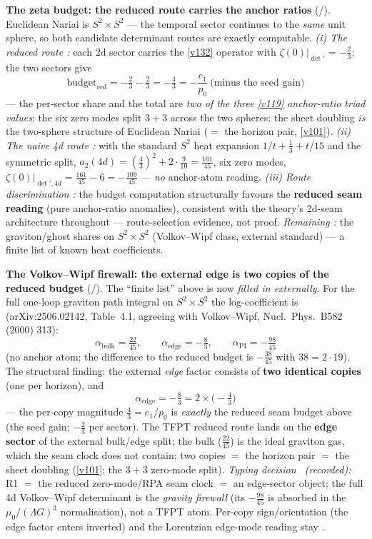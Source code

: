\par\smallskip\noindent\textbf{The zeta budget: the reduced route carries the anchor ratios} (\mE/\mC).
Euclidean Nariai is $S^2\times S^2$ --- the temporal sector continues to the \emph{same} unit sphere,
so both candidate determinant routes are exactly computable. \emph{(i) The reduced route \mE:} each
2d sector carries the \vref{v132} operator with $\zeta(0)|_{\det'}=-\tfrac23$; the two sectors give
\[
  \boxed{\ \text{budget}_{\mathrm{red}}=-\tfrac23-\tfrac23=-\tfrac43=-\frac{e_1}{p_0}\ \text{(minus
  the seed gain)}\ }
\]
--- the per-sector share and the total are \emph{two of the three \vref{v119} anchor-ratio triad values};
the six zero modes split $3+3$ across the two spheres: the sheet doubling \emph{is} the two-sphere
structure of Euclidean Nariai ($=$ the horizon pair, \vref{v101}). \emph{(ii) The naive 4d route \mE:} with
the standard $S^2$ heat expansion $1/t+\tfrac13+t/15$ and the symmetric split, $a_2(4d)=
(\tfrac43)^2+2\cdot\tfrac9{10}=\tfrac{161}{45}$, six zero modes, $\zeta(0)|_{\det',4d}=
\tfrac{161}{45}-6=-\tfrac{109}{45}$ --- \emph{no} anchor-atom reading. \emph{(iii) Route
discrimination \mC:} the budget computation structurally favours the \textbf{reduced seam reading}
(pure anchor-ratio anomalies), consistent with the theory's 2d-seam architecture throughout ---
route-selection evidence, not proof. \emph{Remaining \mC:} the graviton/ghost shares on $S^2\times
S^2$ (Volkov--Wipf class, external standard) --- a finite list of known heat coefficients. 


\par\smallskip\noindent\textbf{The Volkov--Wipf firewall: the external edge is two copies of the reduced budget} (\mE/\mC).
The ``finite list'' above is now \emph{filled in externally}. For the full one-loop graviton path
integral on $S^2\times S^2$ the log-coefficient is (arXiv:2506.02142, Table~4.1, agreeing with
Volkov--Wipf, Nucl.\ Phys.\ B582 (2000) 313):
\[
  \alpha_{\mathrm{bulk}}=\tfrac{22}{45},\qquad \alpha_{\mathrm{edge}}=-\tfrac83,\qquad
  \alpha_{\mathrm{PI}}=-\tfrac{98}{45}
\]
(no anchor atom; the difference to the reduced budget is $-\tfrac{38}{45}$ with $38=2\cdot19$).
The structural finding: the external \emph{edge} factor consists of \textbf{two identical copies} (one
per horizon), and
\[
  \boxed{\ \alpha_{\mathrm{edge}}=-\tfrac83=2\times\bigl(-\tfrac43\bigr)\ }
\]
--- the per-copy magnitude $\tfrac43=e_1/p_0$ is \emph{exactly} the reduced seam budget above (the seed
gain; $-\tfrac23$ per sector). The TFPT reduced route lands on the \textbf{edge sector} of the external
bulk/edge split; the bulk ($\tfrac{22}{45}$) is the ideal graviton gas, which the seam clock does not
contain; two copies $=$ the horizon pair $=$ the sheet doubling (\vref{v101}; the $3{+}3$ zero-mode split).
\emph{Typing decision \mC\ (recorded):} R1 $=$ the reduced zero-mode/RPA seam clock $=$ an edge-sector
object; the full 4d Volkov--Wipf determinant is the \emph{gravity firewall} (its $-\tfrac{98}{45}$ is
absorbed in the $\mu_0/(\Lambda G)^3$ normalisation), not a TFPT atom. Per-copy sign/orientation (the
edge factor enters inverted) and the Lorentzian edge-mode reading stay \mC. 


